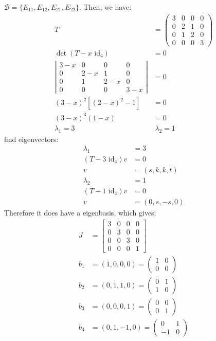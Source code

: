 \documentclass{article}
\begin{document}
\begin{itemize}
    \(\mathcal{B}=\{E_{11},E_{12},E_{21},E_{22}\}\). Then, we have:
    \begin{align*}
        T&=\begin{pmatrix}
            3&0&0&0\\
            0&2&1&0\\
            0&1&2&0\\
            0&0&0&3
        \end{pmatrix}\\
        \det(T-x\text{ id}_4)&=0\\
        \left|\begin{matrix}
            3-x&0&0&0\\
            0&2-x&1&0\\
            0&1&2-x&0\\
            0&0&0&3-x
        \end{matrix}\right|&=0\\
        (3-x)^2[(2-x)^2-1]&=0\\
        (3-x)^3(1-x)&=0\\
        \lambda_1=3&\ \lambda_2=1
    \end{align*}
    find eigenvectors:\\
    \begin{align*}
        \lambda_1&=3\\
        (T-3\text{ id}_4)v&=0\\
        v&=(s,k,k,t)\\
        \lambda_2&=1\\
        (T-1\text{ id}_4)v&=0\\
        v&=(0,s,-s,0)
    \end{align*}
    Therefore it does have a eigenbasis, which gives:
    \begin{align*}
        J&=\begin{bmatrix}
            3&0&0&0\\
            0&3&0&0\\
            0&0&3&0\\
            0&0&0&1
        \end{bmatrix}\\
        b_1&=(1,0,0,0)=\begin{pmatrix}
            1&0\\0&0
        \end{pmatrix}\\
        b_2&=(0,1,1,0)=\begin{pmatrix}
            0&1\\1&0
        \end{pmatrix}\\
        b_3&=(0,0,0,1)=\begin{pmatrix}
            0&0\\
            0&1
        \end{pmatrix}\\
        b_4&=(0,1,-1,0)=\begin{pmatrix}
            0&1\\
            -1&0
        \end{pmatrix}
    \end{align*}
\end{itemize}
\end{document}
